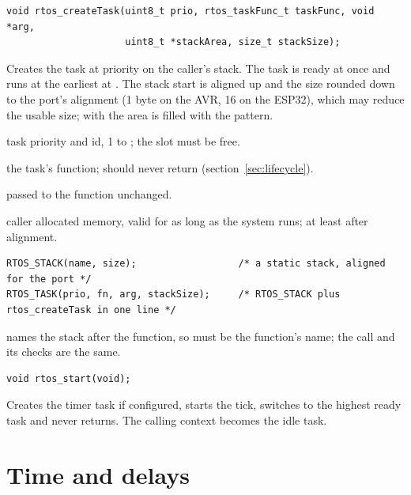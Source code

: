 \begin{lstlisting}
void rtos_createTask(uint8_t prio, rtos_taskFunc_t taskFunc, void *arg,
                     uint8_t *stackArea, size_t stackSize);
\end{lstlisting}
Creates the task at priority  on the caller's stack. The task is ready at once
and runs at the earliest at . The stack start is aligned up and the
size rounded down to the port's alignment (1 byte on the AVR, 16 on the ESP32), which
may reduce the usable size; with  the area is filled with
the pattern.
\begin{apiparams}
\item[prio] task priority and id, 1 to ; the slot must be free.
\item[taskFunc] the task's function; should never return (section~\ref{sec:lifecycle}).
\item[arg] passed to the function unchanged.
\item[stackArea, stackSize] caller allocated memory, valid for as long as the system
  runs; at least  after alignment.
\end{apiparams}
\begin{lstlisting}
RTOS_STACK(name, size);                  /* a static stack, aligned for the port */
RTOS_TASK(prio, fn, arg, stackSize);     /* RTOS_STACK plus rtos_createTask in one line */
\end{lstlisting}
 names the stack after the function, so  must be the
function's name; the call and its checks are the same.

\begin{lstlisting}
void rtos_start(void);
\end{lstlisting}
Creates the timer task if configured, starts the tick, switches to the highest ready
task and never returns. The calling context becomes the idle task.

\section{Time and delays}

